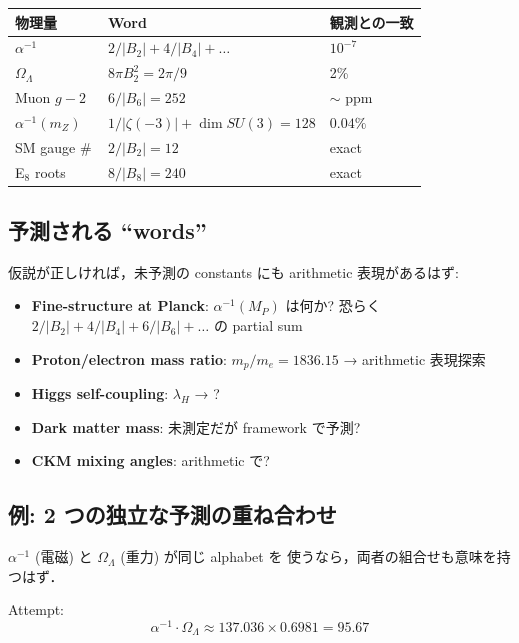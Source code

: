 \documentclass[11pt,a4paper]{article}
\begin{document}
\begin{center}
\begin{tabular}{lll}
\toprule
物理量 & Word & 観測との一致 \\
\midrule
$\alpha^{-1}$ & $2/|B_2| + 4/|B_4| + \ldots$ & $10^{-7}$ \\
$\Omega_\Lambda$ & $8\pi B_2^2 = 2\pi/9$ & 2\% \\
Muon $g-2$ & $6/|B_6| = 252$ & $\sim$ ppm \\
$\alpha^{-1}(m_Z)$ & $1/|\zeta(-3)| + \dim SU(3) = 128$ & $0.04\%$ \\
SM gauge \#\, & $2/|B_2| = 12$ & exact \\
E$_8$ roots & $8/|B_8| = 240$ & exact \\
\bottomrule
\end{tabular}
\end{center}

\subsection{予測される ``words''}

仮説が正しければ，未予測の constants にも arithmetic 表現があるはず:

\begin{itemize}
\item \textbf{Fine-structure at Planck}: $\alpha^{-1}(M_P)$ は何か?
恐らく $2/|B_2| + 4/|B_4| + 6/|B_6| + \ldots$ の partial sum
\item \textbf{Proton/electron mass ratio}: $m_p/m_e = 1836.15$
→ arithmetic 表現探索
\item \textbf{Higgs self-coupling}: $\lambda_H$
→ ?
\item \textbf{Dark matter mass}: 未測定だが framework で予測?
\item \textbf{CKM mixing angles}: arithmetic で?
\end{itemize}

\subsection{例: 2 つの独立な予測の重ね合わせ}

$\alpha^{-1}$ (電磁) と $\Omega_\Lambda$ (重力) が同じ alphabet を
使うなら，両者の組合せも意味を持つはず．

Attempt:
\begin{equation}
\alpha^{-1} \cdot \Omega_\Lambda \approx 137.036 \times 0.6981 = 95.67
\end{equation}
\end{document}
